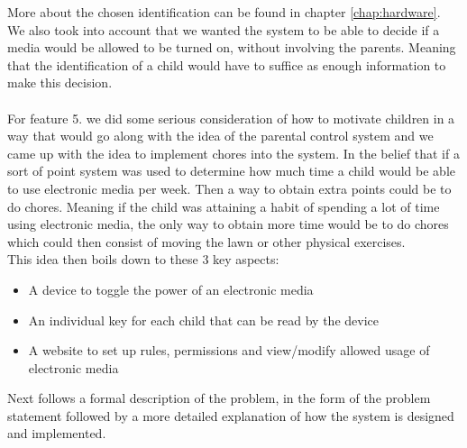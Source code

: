 More about the chosen identification can be found in chapter \vref{chap:hardware}.\\
We also took into account that we wanted the system to be able to decide if a media would be allowed to be turned on, without involving the parents. Meaning that the identification of a child would have to suffice as enough information to make this decision.\\
\\
For feature 5. we did some serious consideration of how to motivate children in a way that would go along with the idea of the parental control system and we came up with the idea to implement chores into the system. In the belief that if a sort of point system was used to determine how much time a child would be able to use electronic media per week. Then a way to obtain extra points could be to do chores. Meaning if the child was attaining a habit of spending a lot of time using electronic media, the only way to obtain more time would be to do chores which could then consist of moving the lawn or other physical exercises.\\

This idea then boils down to these 3 key aspects:

\begin{itemize}
	\item A device to toggle the power of an electronic media
	\item An individual key for each child that can be read by the device
	\item A website to set up rules, permissions and view/modify allowed usage of electronic media
\end{itemize} 

Next follows a formal description of the problem, in the form of the problem statement followed by a more detailed explanation of how the system is designed and implemented.
